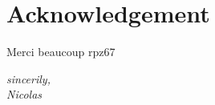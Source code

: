 \chapter*{Acknowledgement}
Merci beaucoup rpz67
\begin{flushright}
    {\it
    sincerily,\\
    Nicolas
    }
\end{flushright}